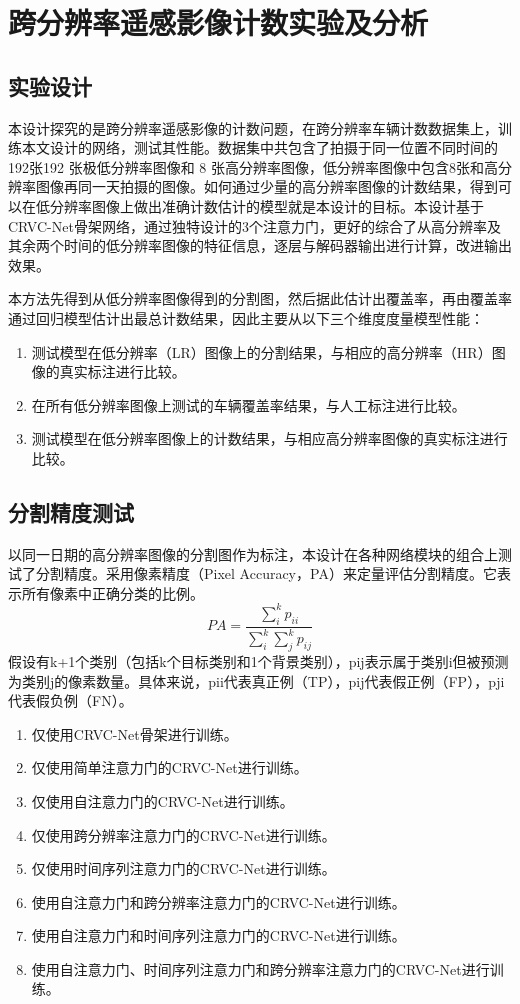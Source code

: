 
\chapter{跨分辨率遥感影像计数实验及分析}
\section{实验设计}
本设计探究的是跨分辨率遥感影像的计数问题，在跨分辨率车辆计数数据集上，训练本文设计的网络，测试其性能。数据集中共包含了拍摄于同一位置不同时间的192张192 张极低分辨率图像和 8 张高分辨率图像，低分辨率图像中包含8张和高分辨率图像再同一天拍摄的图像。如何通过少量的高分辨率图像的计数结果，得到可以在低分辨率图像上做出准确计数估计的模型就是本设计的目标。本设计基于CRVC-Net骨架网络，通过独特设计的3个注意力门，更好的综合了从高分辨率及其余两个时间的低分辨率图像的特征信息，逐层与解码器输出进行计算，改进输出效果。

本方法先得到从低分辨率图像得到的分割图，然后据此估计出覆盖率，再由覆盖率通过回归模型估计出最总计数结果，因此主要从以下三个维度度量模型性能：
\begin{enumerate}    
    \item 测试模型在低分辨率（LR）图像上的分割结果，与相应的高分辨率（HR）图像的真实标注进行比较。
    \item 在所有低分辨率图像上测试的车辆覆盖率结果，与人工标注进行比较。
    \item 测试模型在低分辨率图像上的计数结果，与相应高分辨率图像的真实标注进行比较。
\end{enumerate}
\section{分割精度测试}
以同一日期的高分辨率图像的分割图作为标注，本设计在各种网络模块的组合上测试了分割精度。采用像素精度（Pixel Accuracy，PA）来定量评估分割精度。它表示所有像素中正确分类的比例。
\begin{equation}
    P A=\frac{\sum_{i}^{k} p_{i i}}{\sum_{i}^{k} \sum_{j}^{k} p_{i j}}
\end{equation}
假设有k+1个类别（包括k个目标类别和1个背景类别），pij表示属于类别i但被预测为类别j的像素数量。具体来说，pii代表真正例（TP），pij代表假正例（FP），pji代表假负例（FN）。
\begin{enumerate}    
    \item 仅使用CRVC-Net骨架进行训练。
    \item 仅使用简单注意力门的CRVC-Net进行训练。
    \item 仅使用自注意力门的CRVC-Net进行训练。
    \item 仅使用跨分辨率注意力门的CRVC-Net进行训练。
    \item 仅使用时间序列注意力门的CRVC-Net进行训练。
    \item 使用自注意力门和跨分辨率注意力门的CRVC-Net进行训练。
    \item 使用自注意力门和时间序列注意力门的CRVC-Net进行训练。
    \item 使用自注意力门、时间序列注意力门和跨分辨率注意力门的CRVC-Net进行训练。
\end{enumerate}

